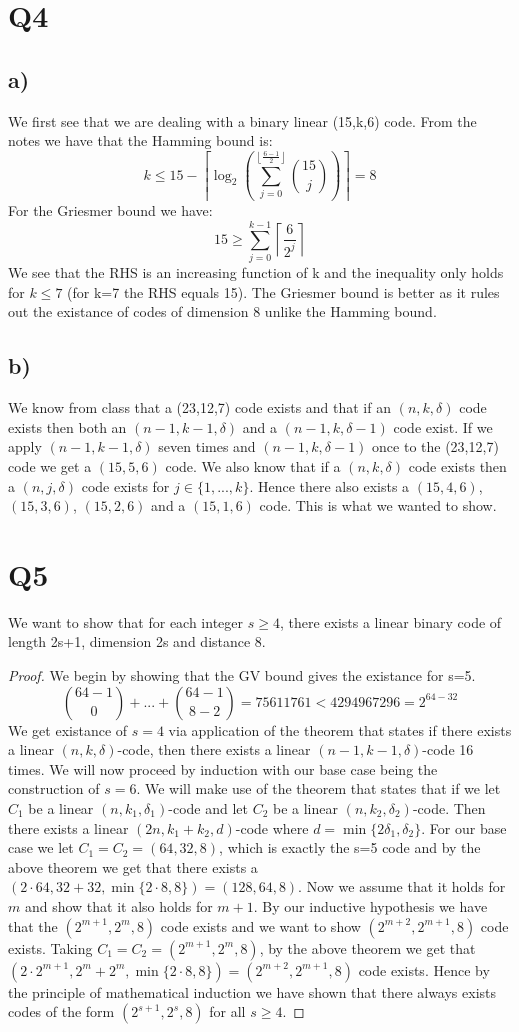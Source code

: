 \documentclass{article}
\begin{document}
\section*{Q4}
\subsection*{a)}
We first see that we are dealing with a binary linear (15,k,6) code. From the notes we have that the Hamming bound is:
$$k\leq 15-\left\lceil\log_2\left(\sum_{j=0}^{\left\lfloor\frac{6-1}{2}\right\rfloor}{15\choose j}\right)\right\rceil=8$$
For the Griesmer bound we have:
$$15\geq \sum_{j=0}^{k-1}\left\lceil\frac{6}{2^j}\right\rceil$$
We see that the RHS is an increasing function of k and the inequality only holds for $k\leq7$ (for k=7 the RHS equals 15). The Griesmer bound is better as it rules out the existance of codes of dimension 8 unlike the Hamming bound.
\subsection*{b)}
We know from class that a (23,12,7) code exists and that if an $(n,k,\delta)$ code exists then both an $(n-1,k-1,\delta)$ and a $(n-1,k,\delta-1)$ code exist. If we apply $(n-1,k-1,\delta)$ seven times and $(n-1,k,\delta-1)$ once to the (23,12,7) code we get a $(15,5,6)$ code. We also know that if a $(n,k,\delta)$ code exists then a $(n,j,\delta)$ code exists for $j\in\{1,...,k\}$. Hence there also exists a $(15,4,6)$, $(15,3,6)$, $(15,2,6)$ and a $(15,1,6)$ code. This is what we wanted to show.
\section*{Q5}
We want to show that for each integer $s\geq4$, there exists a linear binary code of length 2s+1, dimension 2s and distance 8.
\begin{proof}
We begin by showing that the GV bound gives the existance for s=5.
$${64-1\choose0}+...+{64-1\choose8-2}=75611761<4294967296=2^{64-32}$$
We get existance of $s=4$ via application of the theorem that states if there exists a linear $(n, k, \delta)$-code, then there exists a linear $(n - 1, k - 1, \delta)$-code 16 times. We will now proceed by induction with our base case being the construction of $s=6$. We will make use of the theorem that states that if we let $C_1$ be a linear $(n, k_1, \delta_1)$-code and let $C_2$ be a linear $(n, k_2, \delta_2)$-code. Then there exists a linear $(2n, k_1 + k_2, d)$-code where $d = \min\{2\delta_1, \delta_2\}$. For our base case we let $C_1=C_2=(64,32,8)$, which is exactly the s=5 code and by the above theorem we get that there exists a $(2\cdot64,32+32,\min\{2\cdot8, 8\})=(128,64,8)$. Now we assume that it holds for $m$ and show that it also holds for $m+1$. By our inductive hypothesis we have that the $(2^{m+1},2^m,8)$ code exists and we want to show $(2^{m+2},2^{m+1},8)$ code exists. Taking $C_1=C_2=(2^{m+1},2^m,8)$, by the above theorem we get that $(2\cdot2^{m+1},2^{m}+2^{m},\min\{2\cdot8, 8\})=(2^{m+2},2^{m+1},8)$ code exists. Hence by the principle of mathematical induction we have shown that there always exists codes of the form $(2^{s+1},2^s,8)$ for all $s\geq4$. 
\end{proof}
\end{document}

